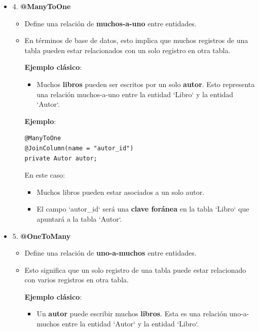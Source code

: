 \documentclass[11pt]{article}
\begin{document}
\begin{itemize}
\begin{itemize}
\begin{itemize}
\textbf{\textbf{Ejemplo}}:
\begin{verbatim}
@Id
@GeneratedValue(strategy = GenerationType.IDENTITY)
private Long id;
\end{verbatim}
En este caso, cuando se inserta un nuevo libro en la tabla `Libro`, la base de datos generará automáticamente el valor para la columna `id`.
\end{itemize}

\item 4. \textbf{\textbf{@ManyToOne}}
\label{sec:orge77ccfe}
\begin{itemize}
\item Define una relación de \textbf{\textbf{muchos-a-uno}} entre entidades.
\item En términos de base de datos, esto implica que muchos registros de una tabla pueden estar relacionados con un solo registro en otra tabla.

\textbf{\textbf{Ejemplo clásico}}:
\begin{itemize}
\item Muchos \textbf{\textbf{libros}} pueden ser escritos por un solo \textbf{\textbf{autor}}. Esto representa una relación muchos-a-uno entre la entidad `Libro` y la entidad `Autor`.
\end{itemize}

\textbf{\textbf{Ejemplo}}:
\begin{verbatim}
@ManyToOne
@JoinColumn(name = "autor_id")
private Autor autor;
\end{verbatim}
En este caso:
\begin{itemize}
\item Muchos libros pueden estar asociados a un solo autor.
\item El campo `autor\_id` será una \textbf{\textbf{clave foránea}} en la tabla `Libro` que apuntará a la tabla `Autor`.
\end{itemize}
\end{itemize}

\item 5. \textbf{\textbf{@OneToMany}}
\label{sec:org299c601}
\begin{itemize}
\item Define una relación de \textbf{\textbf{uno-a-muchos}} entre entidades.
\item Esto significa que un solo registro de una tabla puede estar relacionado con varios registros en otra tabla.

\textbf{\textbf{Ejemplo clásico}}:
\begin{itemize}
\item Un \textbf{\textbf{autor}} puede escribir muchos \textbf{\textbf{libros}}. Esta es una relación uno-a-muchos entre la entidad `Autor` y la entidad `Libro`.
\end{itemize}


\end{itemize}
\end{itemize}
\end{itemize}
\end{document}
